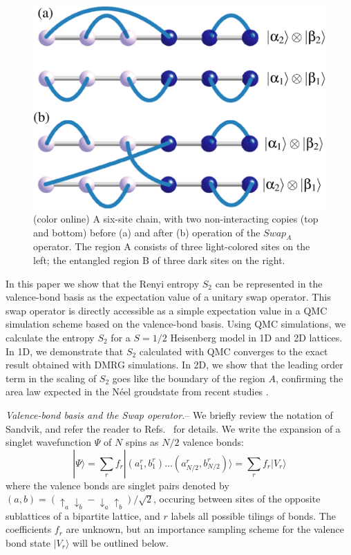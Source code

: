 \documentclass[prl,aps,twocolumn,floatfix,amsmath,amssymb,superscriptaddress,tightenlines]{revtex4}
\begin{document}
\begin{figure} {
\includegraphics[width=2.5
in]{swap_2.eps} \caption{(color online) 
\label{swap_2}
A six-site chain, with two non-interacting copies (top and bottom) before (a) and after (b) operation of the $Swap_A$ operator.  
The region A consists of three light-colored sites on the left; the entangled region B of three dark sites on the right.
}
} \end{figure}

In this paper we show that the Renyi entropy $S_2$ can be represented in the valence-bond basis as the expectation
value of a unitary swap operator.  This swap operator is directly accessible as a simple expectation value in a QMC simulation scheme
based on the valence-bond basis.  Using QMC simulations, we calculate the entropy $S_2$ for a $S=1/2$ Heisenberg model
in 1D and 2D lattices.  In 1D, we demonstrate that $S_2$ calculated with QMC converges to the exact result obtained with DMRG simulations.  In 2D, we show that the leading order term in the scaling of $S_2$ goes like the boundary of the region $A$, 
confirming the area law expected in the N\'eel groudstate from recent studies \cite{Ann}.

{\it Valence-bond basis and the Swap operator.}-- We briefly review the notation of Sandvik, and refer the reader to 
Refs.~\cite{Sandvik,AWSloop} for details.
We write the expansion of a singlet
wavefunction $\Psi$ of $N$ spins as $N/2$ valence bonds:
\begin{equation}
| \Psi \rangle = \sum_r f_r|(a^r_1,b^r_1) \ldots (a^r_{N/2},b^r_{N/2}) \rangle = \sum_r f_r| V_r \rangle
\end{equation}
where the valence bonds are singlet pairs denoted by $(a,b) = (\uparrow_a \downarrow_b - \downarrow_a \uparrow_b)/\sqrt{2}$,
occuring between sites of the opposite sublattices of a bipartite lattice, and $r$ labels all possible tilings of bonds.  The coefficients $f_r$ are unknown, but an importance sampling scheme \cite{Sandvik} for the valence bond state $| V_r \rangle$ will be outlined below.  
\end{document}
